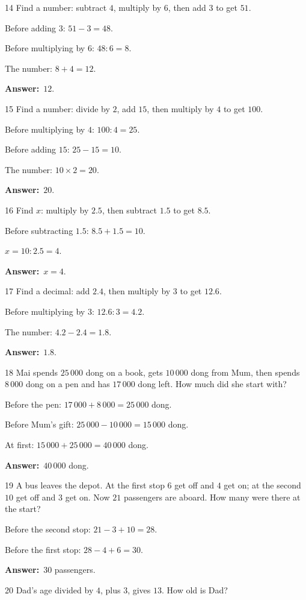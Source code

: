 \documentclass[11pt]{article}
\newif\ifsol \solfalse
\providecommand{\AnsWord}{Đáp số}
\newcommand{\dapso}[1]{\par\textbf{\AnsWord:}\ #1}
\newcommand{\probsol}[1]{%
  \begin{lrbox}{\solmeasure}\begin{minipage}{\dimexpr\linewidth-24pt\relax}#1\end{minipage}\end{lrbox}%
  \ifsol
    \begin{solbox}#1\end{solbox}%
  \else
    \setlength{\solht}{\dimexpr\ht\solmeasure+\dp\solmeasure+0.85cm\relax}%
    \ifdim\solht<1.35cm\setlength{\solht}{1.35cm}\fi
    \begin{tcolorbox}[colback=white,colframe=Line,boxrule=0.8pt,arc=5pt,
      left=8pt,right=8pt,top=4pt,bottom=4pt,height=\solht]{\footnotesize\color{Slate}\itshape\WorkWord}\end{tcolorbox}%
  \fi}
\newcommand{\gap}{\vspace{0.3cm}}
\def\WorkWord{Your work:}
\def\AnsWord{Answer}
\begin{document}
\gap
\begin{probbox}{14}{\relax}
Find a number: subtract $4$, multiply by $6$, then add $3$ to get $51$.
\end{probbox}
\probsol{
Before adding $3$: $51-3=48$.\par Before multiplying by $6$: $48:6=8$.\par The number: $8+4=12$.
\dapso{$12$.}}
\gap
\begin{probbox}{15}{\relax}
Find a number: divide by $2$, add $15$, then multiply by $4$ to get $100$.
\end{probbox}
\probsol{
Before multiplying by $4$: $100:4=25$.\par Before adding $15$: $25-15=10$.\par The number: $10\times2=20$.
\dapso{$20$.}}
\gap
\begin{probbox}{16}{\relax}
Find $x$: multiply by $2.5$, then subtract $1.5$ to get $8.5$.
\end{probbox}
\probsol{
Before subtracting $1.5$: $8.5+1.5=10$.\par $x=10:2.5=4$.
\dapso{$x=4$.}}
\gap
\begin{probbox}{17}{\relax}
Find a decimal: add $2.4$, then multiply by $3$ to get $12.6$.
\end{probbox}
\probsol{
Before multiplying by $3$: $12.6:3=4.2$.\par The number: $4.2-2.4=1.8$.
\dapso{$1.8$.}}
\gap
\begin{probbox}{18}{\relax}
Mai spends $25\,000$ dong on a book, gets $10\,000$ dong from Mum, then spends $8\,000$ dong on a pen and has $17\,000$ dong left. How much did she start with?
\end{probbox}
\probsol{
Before the pen: $17\,000+8\,000=25\,000$ dong.\par Before Mum's gift: $25\,000-10\,000=15\,000$ dong.\par At first: $15\,000+25\,000=40\,000$ dong.
\dapso{$40\,000$ dong.}}
\gap
\begin{probbox}{19}{\relax}
A bus leaves the depot. At the first stop $6$ get off and $4$ get on; at the second $10$ get off and $3$ get on. Now $21$ passengers are aboard. How many were there at the start?
\end{probbox}
\probsol{
Before the second stop: $21-3+10=28$.\par Before the first stop: $28-4+6=30$.
\dapso{$30$ passengers.}}
\gap
\begin{probbox}{20}{\relax}
Dad's age divided by $4$, plus $3$, gives $13$. How old is Dad?
\end{probbox}
\end{document}
